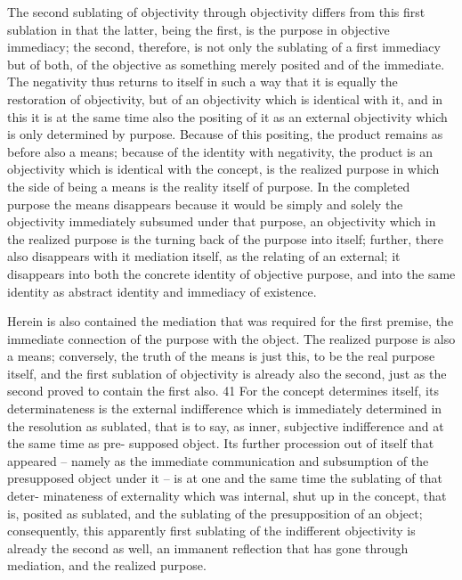 The second sublating of objectivity through objectivity differs from
this first sublation in that the latter, being the first, is the purpose in
objective immediacy; the second, therefore, is not only the sublating of a
first immediacy but of both, of the objective as something merely posited
and of the immediate. The negativity thus returns to itself in such a way
that it is equally the restoration of objectivity, but of an objectivity which
is identical with it, and in this it is at the same time also the positing of it
as an external objectivity which is only determined by purpose. Because of
this positing, the product remains as before also a means; because of the
identity with negativity, the product is an objectivity which is identical with
the concept, is the realized purpose in which the side of being a means is
the reality itself of purpose. In the completed purpose the means disappears
because it would be simply and solely the objectivity immediately subsumed
under that purpose, an objectivity which in the realized purpose is the
turning back of the purpose into itself; further, there also disappears with
it mediation itself, as the relating of an external; it disappears into both
the concrete identity of objective purpose, and into the same identity as
abstract identity and immediacy of existence.

Herein is also contained the mediation that was required for the first
premise, the immediate connection of the purpose with the object. The
realized purpose is also a means; conversely, the truth of the means is just
this, to be the real purpose itself, and the first sublation of objectivity
is already also the second, just as the second proved to contain the first
also. 41 For the concept determines itself, its determinateness is the external
indifference which is immediately determined in the resolution as sublated,
that is to say, as inner, subjective indifference and at the same time as pre-
supposed object. Its further procession out of itself that appeared – namely
as the immediate communication and subsumption of the presupposed
object under it – is at one and the same time the sublating of that deter-
minateness of externality which was internal, shut up in the concept, that is,
posited as sublated, and the sublating of the presupposition of an object;
consequently, this apparently first sublating of the indifferent objectivity is
already the second as well, an immanent reflection that has gone through
mediation, and the realized purpose.

